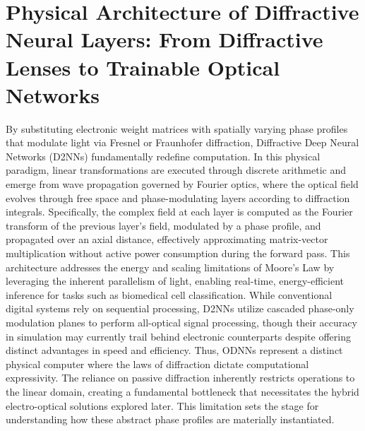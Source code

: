 \documentclass[11pt]{article}
\begin{document}
\section{Physical Architecture of Diffractive Neural Layers: From Diffractive Lenses to Trainable Optical Networks}\label{physical-architecture-of-diffractive-neural-layers-from-diffractive-lenses-to-trainable-optical-networks}

By substituting electronic weight matrices with spatially varying phase profiles that modulate light via Fresnel or Fraunhofer diffraction, Diffractive Deep Neural Networks (D2NNs) fundamentally redefine computation. \citep{doi_10_1126_science_aat8084_e055772d} \citep{doi_10_1117_12_2675468_10b5d458} In this physical paradigm, linear transformations are executed through discrete arithmetic and emerge from wave propagation governed by Fourier optics, where the optical field evolves through free space and phase-modulating layers according to diffraction integrals. Specifically, the complex field at each layer is computed as the Fourier transform of the previous layer's field, modulated by a phase profile, and propagated over an axial distance, effectively approximating matrix-vector multiplication without active power consumption during the forward pass. \citep{doi_10_1117_1_apn_5_1_016005_dfabad74} This architecture addresses the energy and scaling limitations of Moore's Law by leveraging the inherent parallelism of light, enabling real-time, energy-efficient inference for tasks such as biomedical cell classification. While conventional digital systems rely on sequential processing, D2NNs utilize cascaded phase-only modulation planes to perform all-optical signal processing, though their accuracy in simulation may currently trail behind electronic counterparts despite offering distinct advantages in speed and efficiency. Thus, ODNNs represent a distinct physical computer where the laws of diffraction dictate computational expressivity. The reliance on passive diffraction inherently restricts operations to the linear domain, creating a fundamental bottleneck that necessitates the hybrid electro-optical solutions explored later. This limitation sets the stage for understanding how these abstract phase profiles are materially instantiated. \citep{doi_10_1364_ol_593231_ab93febc} \citep{s2_f7b7631268f17b1f868015df0bd08ef57904024d_011f3a59} \citep{doi_10_1063_5_0323145_de1041b1} \citep{doi_10_1109_twc_2025_3632886_01858e99} \citep{doi_10_3390_life13051148_9434b5b6} \citep{doi_10_1364_ol_428761_f1f67ac8} \citep{doi_10_1002_lpor_202200348_d54cae18}
\end{document}
